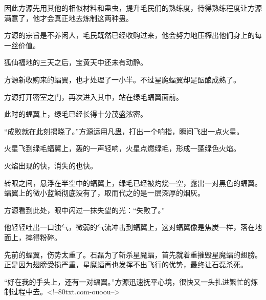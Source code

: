\begin{this_body}
因此方源先用其他的相似材料和蛊虫，提升毛民们的熟练度，待得熟练程度让方源满意了，他才会真正地去炼制这两种蛊。

方源的宗旨是不养闲人，毛民既然已经收购过来，他会努力地压榨出他们身上的每一丝价值。

狐仙福地的三天之后，宝黄天中还未有动静。

方源新收购来的蝠翼，也才处理了一小半。不过星魔蝠翼却是酝酿成熟了。

方源打开密室之门，再次进入其中，站在绿毛蝠翼面前。

此时的蝠翼上，绿毛已经长得十分茂盛浓密。

“成败就在此刻揭晓了。”方源运用凡蛊，打出一个响指，瞬间飞出一点火星。

火星飞到绿毛蝠翼上，轰的一声轻响，火星点燃绿毛，形成一蓬绿色火焰。

火焰出现的快，消失的也快。

转眼之间，悬浮在半空中的蝠翼上，绿毛已经被灼烧一空，露出一对黑色的蝠翼。蝠翼上的微小蓝鳞彻底没有了，取而代之的是一层深厚的烟灰。

方源看到此处，眼中闪过一抹失望的光：“失败了。”

他轻轻吐出一口浊气，微弱的气流冲击到蝠翼上，这对蝠翼像是焦炭一样，落在地面上，摔得粉碎。

先前的蝠翼，伤势太重了。石磊为了斩杀星魔蝠，首先就着重摧毁星魔蝠的翅膀。正是因为翅膀受损严重，星魔蝠再也发挥不出飞行的优势，最终让石磊杀死。

“好在我的手头上，还有一对蝠翼。”方源迅速抚平心境，很快又一头扎进繁忙的炼制过程中去。<!--80txt.com-ouoou-->

\end{this_body}

